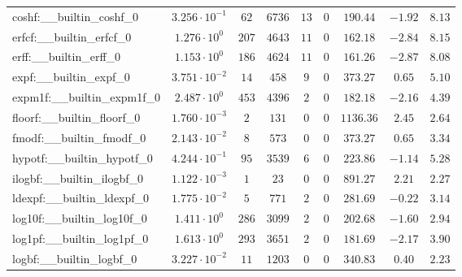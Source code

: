 \begin{tabular}{|l|c|c|c|c|c|c|c|c|}
coshf:\_\_builtin\_coshf\_0               & $ 3.256 \cdot 10^{-1} $ & $ 62     $ & $ 6736   $ & $ 13  $ & $ 0   $ & $ 190.44      $ & $ -1.92   $ & $ 8.13    $ \\
erfcf:\_\_builtin\_erfcf\_0               & $ 1.276 \cdot 10^{0}  $ & $ 207    $ & $ 4643   $ & $ 11  $ & $ 0   $ & $ 162.18      $ & $ -2.84   $ & $ 8.15    $ \\
erff:\_\_builtin\_erff\_0                 & $ 1.153 \cdot 10^{0}  $ & $ 186    $ & $ 4624   $ & $ 11  $ & $ 0   $ & $ 161.26      $ & $ -2.87   $ & $ 8.08    $ \\
expf:\_\_builtin\_expf\_0                 & $ 3.751 \cdot 10^{-2} $ & $ 14     $ & $ 458    $ & $ 9   $ & $ 0   $ & $ 373.27      $ & $ 0.65    $ & $ 5.10    $ \\
expm1f:\_\_builtin\_expm1f\_0             & $ 2.487 \cdot 10^{0}  $ & $ 453    $ & $ 4396   $ & $ 2   $ & $ 0   $ & $ 182.18      $ & $ -2.16   $ & $ 4.39    $ \\
floorf:\_\_builtin\_floorf\_0             & $ 1.760 \cdot 10^{-3} $ & $ 2      $ & $ 131    $ & $ 0   $ & $ 0   $ & $ 1136.36     $ & $ 2.45    $ & $ 2.64    $ \\
fmodf:\_\_builtin\_fmodf\_0               & $ 2.143 \cdot 10^{-2} $ & $ 8      $ & $ 573    $ & $ 0   $ & $ 0   $ & $ 373.27      $ & $ 0.65    $ & $ 3.34    $ \\
hypotf:\_\_builtin\_hypotf\_0             & $ 4.244 \cdot 10^{-1} $ & $ 95     $ & $ 3539   $ & $ 6   $ & $ 0   $ & $ 223.86      $ & $ -1.14   $ & $ 5.28    $ \\
ilogbf:\_\_builtin\_ilogbf\_0             & $ 1.122 \cdot 10^{-3} $ & $ 1      $ & $ 23     $ & $ 0   $ & $ 0   $ & $ 891.27      $ & $ 2.21    $ & $ 2.27    $ \\
ldexpf:\_\_builtin\_ldexpf\_0             & $ 1.775 \cdot 10^{-2} $ & $ 5      $ & $ 771    $ & $ 2   $ & $ 0   $ & $ 281.69      $ & $ -0.22   $ & $ 3.14    $ \\
log10f:\_\_builtin\_log10f\_0             & $ 1.411 \cdot 10^{0}  $ & $ 286    $ & $ 3099   $ & $ 2   $ & $ 0   $ & $ 202.68      $ & $ -1.60   $ & $ 2.94    $ \\
log1pf:\_\_builtin\_log1pf\_0             & $ 1.613 \cdot 10^{0}  $ & $ 293    $ & $ 3651   $ & $ 2   $ & $ 0   $ & $ 181.69      $ & $ -2.17   $ & $ 3.90    $ \\
logbf:\_\_builtin\_logbf\_0               & $ 3.227 \cdot 10^{-2} $ & $ 11     $ & $ 1203   $ & $ 0   $ & $ 0   $ & $ 340.83      $ & $ 0.40    $ & $ 2.23    $ \\

\end{tabular}
